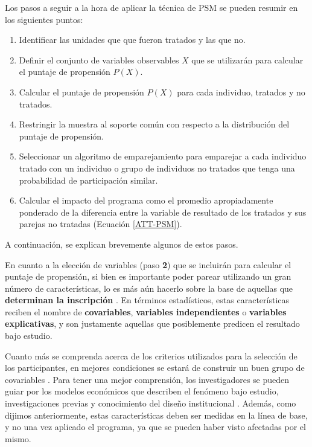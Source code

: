 \documentclass[../../main.tex]{subfiles}
\begin{document}
Los pasos a seguir a la hora de aplicar la técnica de PSM se pueden resumir en los
siguientes puntos:
\begin{enumerate}[label=\textbf{\arabic*.}]
    \item Identificar las unidades que que fueron tratados y las que no.
    \item Definir el conjunto de variables observables \(X\) que se utilizarán para
    calcular el puntaje de propensión \(P(X)\).
    \item Calcular el puntaje de propensión \(P(X)\) para cada individuo, tratados
    y no tratados.
    \item Restringir la muestra al soporte común con respecto a la distribución
    del puntaje de propensión.
    \item Seleccionar un algoritmo de emparejamiento para emparejar a cada individuo
    tratado con un individuo o grupo de individuos no tratados que tenga una probabilidad
    de participación similar.
    \item Calcular el impacto del programa como el promedio apropiadamente ponderado de la
    diferencia entre la variable de resultado de los tratados y sus parejas no tratadas
    (Ecuación \ref{ATT-PSM}).
\end{enumerate}
A continuación, se explican brevemente algunos de estos pasos.

En cuanto a la elección de variables (paso \textbf{2}) que se incluirán para calcular el
puntaje de propensión, si bien es importante poder parear utilizando un gran número de
características, lo es más aún hacerlo sobre la base de aquellas que \textbf{determinan la
inscripción} \cite{gertler-2016}. En términos estadísticos, estas características reciben
el nombre de \textbf{covariables}, \textbf{variables independientes} o \textbf{variables
explicativas}, y son justamente aquellas que posiblemente predicen el resultado bajo
estudio.

Cuanto más se comprenda acerca de los criterios utilizados para la selección de los
participantes, en mejores condiciones se estará de construir un buen grupo de covariables
\cite{gertler-2016}. Para tener una mejor comprensión, los investigadores se pueden guiar
por los modelos económicos que describen el fenómeno bajo estudio, investigaciones previas
y conocimiento del diseño institucional \cite{bernal}. Además, como dijimos anteriormente,
estas características deben ser medidas en la línea de base, y no una vez aplicado el
programa, ya que se pueden haber visto afectadas por el mismo.
\end{document}
